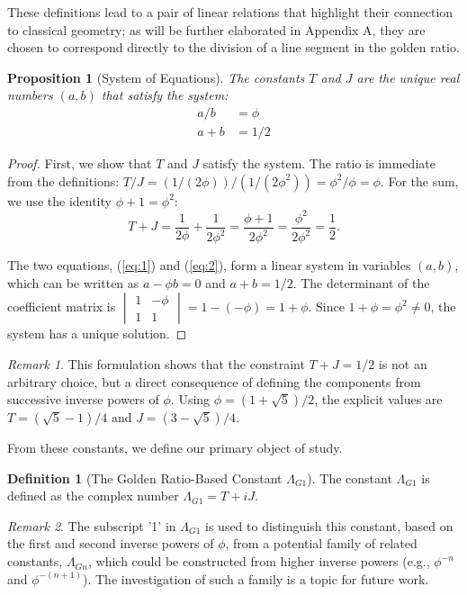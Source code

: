 \documentclass{amsart}
\theoremstyle{plain}
\newtheorem{proposition}[theorem]{Proposition}
\theoremstyle{definition}
\newtheorem{definition}[theorem]{Definition}
\theoremstyle{remark}
\newtheorem*{remark}{Remark}
\newcommand{\LambdaG}{\Lambda_{G1}}
\newcommand{\phiG}{\phi}
\begin{document}
These definitions lead to a pair of linear relations that highlight their connection to classical geometry; as will be further elaborated in Appendix A, they are chosen to correspond directly to the division of a line segment in the golden ratio.
\begin{proposition}[System of Equations]
The constants $T$ and $J$ are the unique real numbers $(a,b)$ that satisfy the system:
\begin{align}
    a/b &= \phiG \label{eq:1} \\
    a+b &= 1/2 \label{eq:2}
\end{align}
\end{proposition}
\begin{proof}
First, we show that $T$ and $J$ satisfy the system. The ratio is immediate from the definitions: $T/J = (1/(2\phiG))/(1/(2\phiG^2)) = \phiG^2/\phiG = \phiG$. For the sum, we use the identity $\phiG+1 = \phiG^2$:
\[ T+J = \frac{1}{2\phiG} + \frac{1}{2\phiG^2} = \frac{\phiG+1}{2\phiG^2} = \frac{\phiG^2}{2\phiG^2} = \frac{1}{2}. \] 

The two equations, (\ref{eq:1}) and (\ref{eq:2}), form a linear system in variables $(a,b)$, which can be written as $a - \phiG b = 0$ and $a+b=1/2$. The determinant of the coefficient matrix is $\begin{vmatrix} 1 & -\phiG \\ 1 & 1 \end{vmatrix} = 1 - (-\phiG) = 1+\phiG$. Since $1+\phiG = \phiG^2 \neq 0$, the system has a unique solution.
\end{proof}

\begin{remark}
This formulation shows that the constraint $T+J=1/2$ is not an arbitrary choice, but a direct consequence of defining the components from successive inverse powers of $\phiG$. Using $\phiG = (1+\sqrt{5})/2$, the explicit values are $T = (\sqrt{5}-1)/4$ and $J = (3-\sqrt{5})/4$.
\end{remark}

From these constants, we define our primary object of study.
\begin{definition}[The Golden Ratio-Based Constant \texorpdfstring{$\LambdaG$}{Lambda\_G1}]
The constant $\LambdaG$ is defined as the complex number $\LambdaG = T+iJ$.
\end{definition}

\begin{remark}
The subscript '1' in $\LambdaG$ is used to distinguish this constant, based on the first and second inverse powers of $\phiG$, from a potential family of related constants, $\Lambda_{Gn}$, which could be constructed from higher inverse powers (e.g., $\phiG^{-n}$ and $\phiG^{-(n+1)}$). The investigation of such a family is a topic for future work.
\end{remark}
\end{document}
